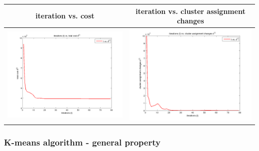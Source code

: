 \documentclass[fleqn]{article}
\begin{document}
\begin{center}
  \begin{longtable}{ c | c }
	\multicolumn{1}{c}{iteration vs. cost} & 
	\multicolumn{1}{c}{iteration vs. cluster assignment changes}  \\
    \hline
    \includegraphics[scale=0.4]{./pics/task1and2/rio_k=8_random/t_vs_d_random_8_rio.png}  & \includegraphics[scale=0.4]{./pics/task1and2/rio_k=8_random/t_vs_s_random_8_rio.png} \\
    \hline
  \end{longtable}
\end{center}

\subsubsection{K-means algorithm - general property}
\end{document}
